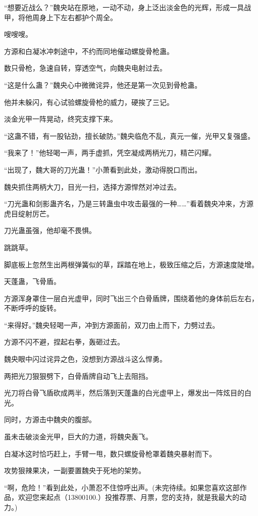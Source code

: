 \begin{this_body}
“想要近战么？”魏央站在原地，一动不动，身上泛出淡金色的光辉，形成一具战甲，将他周身上下左右都护个周全。

嗖嗖嗖。

方源和白凝冰冲刺途中，不约而同地催动螺旋骨枪蛊。

数只骨枪，急速自转，穿透空气，向魏央电射过去。

“这是什么蛊？”魏央心中微微诧异，他还是第一次见到骨枪蛊。

他并未躲闪，有心试验螺旋骨枪的威力，硬挨了三记。

淡金光甲一阵晃动，终究支撑下来。

“这蛊不错，有一股钻劲，擅长破防。”魏央临危不乱，真元一催，光甲又复强盛。

“我来了！”他轻喝一声，两手虚抓，凭空凝成两柄光刀，精芒闪耀。

“出现了，魏大哥的刀光蛊！”小萧看到此处，激动得脱口而出。

魏央抓住两柄大刀，目光一扫，选择方源悍然对冲过去。

“刀光蛊和剑影蛊齐名，乃是三转蛊虫中攻击最强的一种……”看着魏央冲来，方源虎目绽射厉芒。

刀光蛊虽强，他却毫不畏惧。

跳跳草。

脚底板上忽然生出两根弹簧似的草，踩踏在地上，极致压缩之后，方源速度陡增。

天蓬蛊，飞骨盾。

方源浑身罩住一层白光虚甲，同时飞出三个白骨盾牌，围绕着他的身体前后左右，不断呼呼的旋转。

“来得好。”魏央轻喝一声，冲到方源面前，双刀由上而下，力劈过去。

方源不闪不避，捏起右拳，轰砸过去。

魏央眼中闪过诧异之色，没想到方源战斗这么悍勇。

两把光刀狠狠劈下，白骨盾牌自动飞上去阻挡。

光刀将白骨飞盾砍成两半，然后落到天蓬蛊的白光虚甲上，爆发出一阵炫目的白光。

同时，方源击中魏央的腹部。

虽未击破淡金光甲，巨大的力道，将魏央轰飞。

白凝冰这时恰巧赶上，手臂一甩，数只螺旋骨枪罩着魏央暴射而下。

攻势狠辣果决，一副要置魏央于死地的架势。

“啊，危险！”看到此处，小萧忍不住惊呼出声。(未完待续。如果您喜欢这部作品，欢迎您来起点（13800100.）投推荐票、月票，您的支持，就是我最大的动力。)

\end{this_body}

